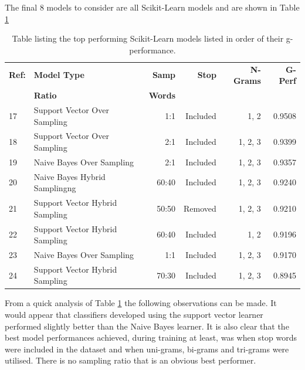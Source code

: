 The final 8 models to consider are all Scikit-Learn models and are shown in Table \ref{tab:chapter5:top_scikit_models}

\begin{table}[h]
	\centering
	\caption[Top performing Scikit-Learn models]{Table listing the top performing Scikit-Learn models listed in order of their g-performance.}
	\label{tab:chapter5:top_scikit_models}
	\begin{tabular}{llrrrr}
		\toprule
		\textbf{Ref:}  & \textbf{Model Type} & \textbf{Samp}  & \textbf{Stop}   & \textbf{N-Grams} & \textbf{G-Perf}  \\
		                    & \textbf{Ratio} & \textbf{Words}  &                  &   \\
		\midrule
		17  & Support Vector Over Sampling & 1:1 & Included & 1, 2 & 0.9508  \\
		18  & Support Vector Over Sampling & 2:1 & Included & 1, 2, 3 & 0.9399  \\
		19  & Naive Bayes Over Sampling & 2:1 & Included & 1, 2, 3  & 0.9357  \\
		20  & Naive Bayes Hybrid Samplingng & 60:40 & Included & 1, 2, 3  & 0.9240  \\
		21  & Support Vector Hybrid Sampling & 50:50 & Removed & 1, 2, 3 & 0.9210  \\
		22  & Support Vector Hybrid Sampling & 60:40 & Included & 1, 2 & 0.9196  \\
		23  & Naive Bayes Over Sampling & 1:1 & Included & 1, 2, 3 & 0.9170  \\
		24  & Support Vector Hybrid Sampling & 70:30 & Included & 1, 2, 3 & 0.8945  \\
		\bottomrule
    \end{tabular}
\end{table}

From a quick analysis of Table \ref{tab:chapter5:top_scikit_models} the following observations can be made. It would appear that classifiers developed using the support vector learner performed slightly better than the Naive Bayes learner. It is also clear that the best model performances achieved, during training at least, was when stop words were included in the dataset and when uni-grams, bi-grams and tri-grams were utilised. There is no sampling ratio that is an obvious best performer.